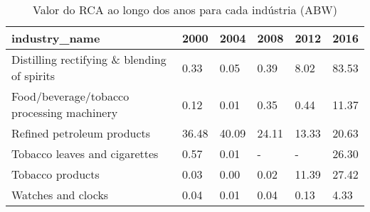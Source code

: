 \begin{table}
\centering
\caption{Valor do RCA ao longo dos anos para cada indústria (ABW)}
\begin{tabular}{p{6cm}p{1.5cm}p{1.5cm}p{1.5cm}p{1.5cm}p{1.5cm}}
\toprule
                              industry\_name &  2000 &  2004 &  2008 &  2012 &  2016 \\
\midrule
Distilling rectifying \& blending of spirits &  0.33 &  0.05 &  0.39 &  8.02 & 83.53 \\
 Food/beverage/tobacco processing machinery &  0.12 &  0.01 &  0.35 &  0.44 & 11.37 \\
                 Refined petroleum products & 36.48 & 40.09 & 24.11 & 13.33 & 20.63 \\
              Tobacco leaves and cigarettes &  0.57 &  0.01 &     - &     - & 26.30 \\
                           Tobacco products &  0.03 &  0.00 &  0.02 & 11.39 & 27.42 \\
                         Watches and clocks &  0.04 &  0.01 &  0.04 &  0.13 &  4.33 \\
\bottomrule
\end{tabular}
\end{table}
